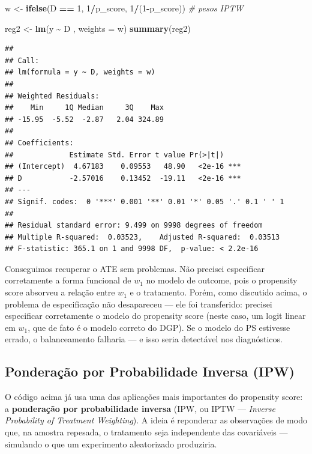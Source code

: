 \documentclass[
]{article}
\newenvironment{Shaded}{\begin{snugshade}}{\end{snugshade}}
\newcommand{\AttributeTok}[1]{\textcolor[rgb]{0.13,0.29,0.53}{#1}}
\newcommand{\CommentTok}[1]{\textcolor[rgb]{0.56,0.35,0.01}{\textit{#1}}}
\newcommand{\DecValTok}[1]{\textcolor[rgb]{0.00,0.00,0.81}{#1}}
\newcommand{\FunctionTok}[1]{\textcolor[rgb]{0.13,0.29,0.53}{\textbf{#1}}}
\newcommand{\NormalTok}[1]{#1}
\newcommand{\OtherTok}[1]{\textcolor[rgb]{0.56,0.35,0.01}{#1}}
\newcommand{\SpecialCharTok}[1]{\textcolor[rgb]{0.81,0.36,0.00}{\textbf{#1}}}
\begin{document}
\begin{Shaded}
\begin{Highlighting}[]
\NormalTok{w }\OtherTok{\textless{}{-}} \FunctionTok{ifelse}\NormalTok{(D }\SpecialCharTok{==} \DecValTok{1}\NormalTok{, }\DecValTok{1}\SpecialCharTok{/}\NormalTok{p\_score, }\DecValTok{1}\SpecialCharTok{/}\NormalTok{(}\DecValTok{1}\SpecialCharTok{{-}}\NormalTok{p\_score))   }\CommentTok{\# pesos IPTW}

\NormalTok{reg2 }\OtherTok{\textless{}{-}} \FunctionTok{lm}\NormalTok{(y }\SpecialCharTok{\textasciitilde{}}\NormalTok{ D , }\AttributeTok{weights =}\NormalTok{ w)}
\FunctionTok{summary}\NormalTok{(reg2)}
\end{Highlighting}
\end{Shaded}

\begin{verbatim}
## 
## Call:
## lm(formula = y ~ D, weights = w)
## 
## Weighted Residuals:
##    Min     1Q Median     3Q    Max 
## -15.95  -5.52  -2.87   2.04 324.89 
## 
## Coefficients:
##             Estimate Std. Error t value Pr(>|t|)    
## (Intercept)  4.67183    0.09553   48.90   <2e-16 ***
## D           -2.57016    0.13452  -19.11   <2e-16 ***
## ---
## Signif. codes:  0 '***' 0.001 '**' 0.01 '*' 0.05 '.' 0.1 ' ' 1
## 
## Residual standard error: 9.499 on 9998 degrees of freedom
## Multiple R-squared:  0.03523,    Adjusted R-squared:  0.03513 
## F-statistic: 365.1 on 1 and 9998 DF,  p-value: < 2.2e-16
\end{verbatim}

Conseguimos recuperar o ATE sem problemas. Não precisei especificar corretamente a forma funcional de \(w_1\) no modelo de outcome, pois o propensity score absorveu a relação entre \(w_1\) e o tratamento. Porém, como discutido acima, o problema de especificação não desapareceu --- ele foi transferido: precisei especificar corretamente o modelo do propensity score (neste caso, um logit linear em \(w_1\), que de fato é o modelo correto do DGP). Se o modelo do PS estivesse errado, o balanceamento falharia --- e isso seria detectável nos diagnósticos.

\subsection{Ponderação por Probabilidade Inversa (IPW)}\label{ponderauxe7uxe3o-por-probabilidade-inversa-ipw}

O código acima já usa uma das aplicações mais importantes do propensity score: a \textbf{ponderação por probabilidade inversa} (IPW, ou IPTW --- \emph{Inverse Probability of Treatment Weighting}). A ideia é reponderar as observações de modo que, na amostra repesada, o tratamento seja independente das covariáveis --- simulando o que um experimento aleatorizado produziria.
\end{document}
